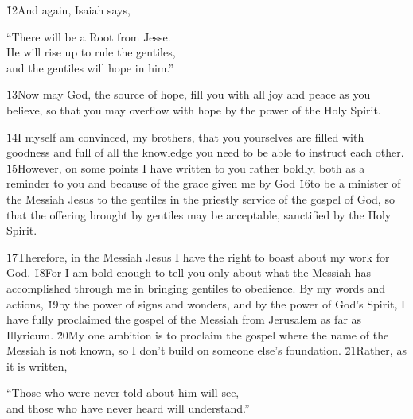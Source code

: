 \v{12}And again, Isaiah says,

\begin{poetry}
\poeml ``There will be a Root from Jesse. \\
\poemll    He will rise up to rule the gentiles, \\
\poemlll       and the gentiles will hope in him.''
\end{poetry}

\v{13}Now may God, the source of hope, fill you with all joy and peace as you believe, so that you may overflow with hope by the power of the Holy Spirit.

\v{14}I myself am convinced, my brothers, that you yourselves are filled with goodness and full of all the knowledge you need to be able to instruct each other. \v{15}However, on some points I have written to you rather boldly, both as a reminder to you and because of the grace given me by God \v{16}to be a minister of the Messiah Jesus to the gentiles in the priestly service of the gospel of God, so that the offering brought by gentiles may be acceptable, sanctified by the Holy Spirit.

\v{17}Therefore, in the Messiah Jesus I have the right to boast about my work for God. \v{18}For I am bold enough to tell you only about what the Messiah has accomplished through me in bringing gentiles to obedience. By my words and actions, \v{19}by the power of signs and wonders, and by the power of God's Spirit, I have fully proclaimed the gospel of the Messiah from Jerusalem as far as Illyricum. \v{20}My one ambition is to proclaim the gospel where the name of the Messiah is not known, so I don't build on someone else's foundation. \v{21}Rather, as it is written,

\begin{poetry}
\poeml ``Those who were never told about him will see, \\
\poemll    and those who have never heard will understand.''
\end{poetry}

